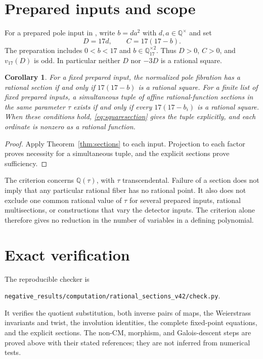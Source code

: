 \documentclass[11pt,a4paper]{article}
\newtheorem{corollary}[theorem]{Corollary}
\newcommand{\Q}{\mathbb Q}\newcommand{\Z}{\mathbb Z}
\begin{document}
\section{Prepared inputs and scope}

For a prepared pole input in \cite{Guards}, write $b=da^2$ with
$d,a\in\Q^\times$ and set
\[
                   D=17d,\qquad C=17(17-b).
\]
The preparation includes $0<b<17$ and $b\in\Q_{17}^{\times2}$.
Thus $D>0$, $C>0$, and $v_{17}(D)$ is odd. In particular neither
$D$ nor $-3D$ is a rational square.

\begin{corollary}\label{cor:prepared}
For a fixed prepared input, the normalized pole fibration has a
rational section if and only if $17(17-b)$ is a rational square.
For a finite list of fixed prepared inputs, a simultaneous tuple
of affine rational-function sections in the same parameter $\tau$
exists if and only if every $17(17-b_i)$ is a rational square.
When these conditions hold, \eqref{eq:squaresection} gives the tuple
explicitly, and each ordinate is nonzero as a rational function.
\end{corollary}
\begin{proof}
Apply Theorem~\ref{thm:sections} to each input. Projection to each
factor proves necessity for a simultaneous tuple, and the explicit
sections prove sufficiency.
\end{proof}

The criterion concerns $\Q(\tau)$, with $\tau$ transcendental.
Failure of a section does not imply that any particular rational
fiber has no rational point. It also does not exclude one common
rational value of $\tau$ for several prepared inputs, rational
multisections, or constructions that vary the detector inputs.
The criterion alone therefore gives no reduction in the number of
variables in a defining polynomial.

\section{Exact verification}

The reproducible checker is
\begin{center}\small
\texttt{negative\_results/computation/rational\_sections\_v42/check.py}.
\end{center}
It verifies the quotient substitution, both inverse pairs of maps,
the Weierstrass invariants and twist, the involution identities,
the complete fixed-point equations, and the explicit sections.
The non-CM, morphism, and Galois-descent steps are proved above with
their stated references; they are not inferred from numerical tests.
\end{document}
